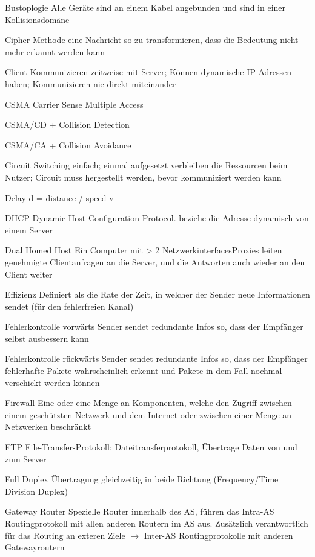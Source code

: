 \documentclass[10pt,landscape]{article}
\begin{document}
\begin{multicols}{3}
\begin{description*}
        \item[Bustoplogie] Alle Geräte sind an einem Kabel angebunden und sind in einer Kollisionsdomäne
        \item[Cipher] Methode eine Nachricht so zu transformieren, dass die Bedeutung nicht mehr erkannt werden kann
        \item[Client] Kommunizieren zeitweise mit Server; Können dynamische IP-Adressen haben; Kommunizieren nie direkt miteinander
        \item[CSMA] Carrier Sense Multiple Access
        \item[CSMA/CD] + Collision Detection
        \item[CSMA/CA] + Collision Avoidance
        \item[Circuit Switching] einfach; einmal aufgesetzt verbleiben die Ressourcen beim Nutzer; Circuit muss hergestellt werden, bevor kommuniziert werden kann
        \item[Delay d] = distance / speed v
        \item[DHCP] Dynamic Host Configuration Protocol. beziehe die Adresse dynamisch von einem Server
        \item[Dual Homed Host] Ein Computer mit > 2 NetzwerkinterfacesProxies leiten genehmigte Clientanfragen an die Server, und die Antworten auch wieder an den Client weiter
        \item[Effizienz] Definiert als die Rate der Zeit, in welcher der Sender neue Informationen sendet (für den fehlerfreien Kanal)
        \item[Fehlerkontrolle vorwärts] Sender sendet redundante Infos so, dass der Empfänger selbst ausbessern kann
        \item[Fehlerkontrolle rückwärts] Sender sendet redundante Infos so, dass der Empfänger fehlerhafte Pakete wahrscheinlich erkennt und Pakete in dem Fall nochmal verschickt werden können
        \item[Firewall] Eine oder eine Menge an Komponenten, welche den Zugriff zwischen einem geschützten Netzwerk und dem Internet oder zwischen einer Menge an Netzwerken beschränkt
        \item[FTP] File-Transfer-Protokoll: Dateitransferprotokoll, Übertrage Daten von und zum Server
        \item[Full Duplex] Übertragung gleichzeitig in beide Richtung (Frequency/Time Division Duplex)
        \item[Gateway Router] Spezielle Router innerhalb des AS, führen das Intra-AS Routingprotokoll mit allen anderen Routern im AS aus. Zusätzlich verantwortlich für das Routing an exteren Ziele $\rightarrow$ Inter-AS Routingprotokolle mit anderen Gatewayroutern

\end{description*}
\end{multicols}
\end{document}
